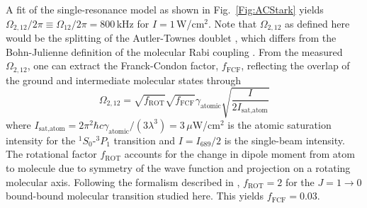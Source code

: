 %





A fit of the single-resonance model as shown in Fig.\ \ref{Fig:ACStark} yields $\Omega_{2,12}/2\pi\equiv\Omega_{12}/2\pi=800$\,kHz for $I=1$\,W/cm$^2$.
Note that $\Omega_{2,12}$ as defined here would be the splitting of the Autler-Townes doublet \cite{Pachomow2017a}, which differs from the Bohn-Julienne definition of the molecular Rabi coupling \cite{bju96}. From the measured $\Omega_{2,12}$, one can extract the Franck-Condon factor, $f_{\text{FCF}}$, reflecting the overlap of the ground and intermediate molecular states through
\begin{equation}\label{Eq:FranckCondonRabiFrequency}
	\Omega_{2,12}=\sqrt{f_{\text{ROT}}}\sqrt{f_{\text{FCF}}}\gamma_{\text{atomic}}\sqrt{\frac{I}{2 I_{\text{sat,atom}}}}
\end{equation}
where $I_{\text{sat,atom}}=2\pi^2\hbar c \gamma_{\text{atomic}}/(3\lambda^3)=3$\,$\mu$W/cm$^2$ is the atomic saturation intensity for the $^1S_0$-$^3P_1$ transition and $I=I_{689}/2$ is the single-beam intensity. The rotational factor $f_{\text{ROT}}$ accounts for the change in dipole moment from atom to molecule due to symmetry of the wave function and projection on a rotating molecular axis. Following the formalism described in \cite{Pachomow2017a}, $f_{\text{ROT}}=2$ for the $J=1\rightarrow 0$ bound-bound molecular transition studied here. This yields $f_{\text{FCF}}=0.03$.

